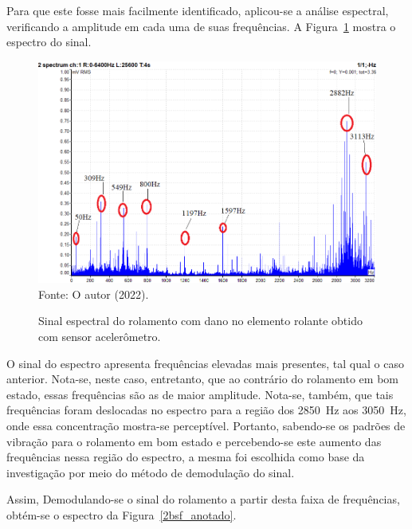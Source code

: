\documentclass[
	12pt,				
	oneside,			
	a4paper,			
	english,			
	brazil,	
	sumario=abnt-6027-2012		
	]{abntex2ppgsi}
\begin{document}
Para que este fosse mais facilmente identificado, aplicou-se a análise espectral, verificando a amplitude em cada uma de suas frequências. A Figura~\ref{espectro_rolamento_dano_rolante_mc6v_mv} mostra o espectro do sinal. 

\begin{figure}[H]
\centering
\caption {Sinal espectral do rolamento com dano no elemento rolante obtido com sensor acelerômetro.}
\includegraphics[width=\textwidth,keepaspectratio]{espectro_rolamento_dano_rolante_mc6v_mv_anotado} \\
Fonte: O autor (2022).
\label{espectro_rolamento_dano_rolante_mc6v_mv}
\end{figure}

O sinal do espectro apresenta frequências elevadas mais presentes, tal qual o caso anterior. Nota-se, neste caso, entretanto, que ao contrário do rolamento em bom estado, essas frequências são as de maior amplitude. Nota-se, também, que tais frequências foram deslocadas no espectro para a região dos \SI{2850}{\hertz} aos \SI{3050}{\hertz}, onde essa concentração mostra-se perceptível. Portanto, sabendo-se os padrões de vibração para o rolamento em bom estado e percebendo-se este aumento das frequências nessa região do espectro, a mesma foi escolhida como base da investigação por meio do método de demodulação do sinal.

Assim, Demodulando-se o sinal do rolamento a partir desta faixa de frequências, obtém-se o espectro da Figura~\ref{2bsf_anotado}. 
\end{document}
